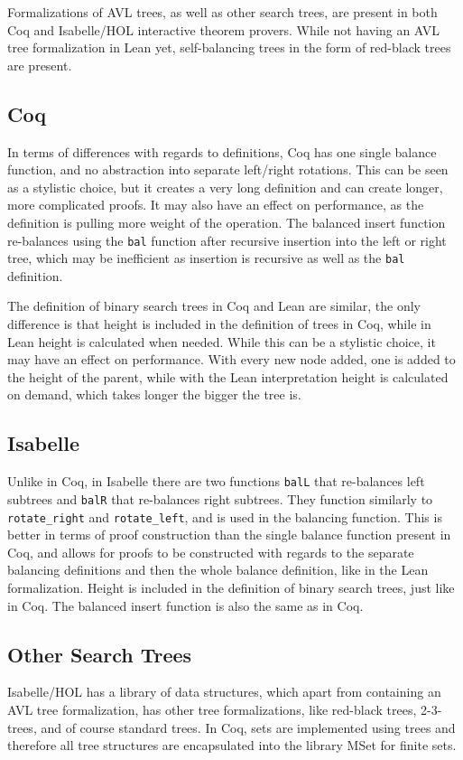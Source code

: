 Formalizations of AVL trees, as well as other search trees, are present in both Coq \cite{code:coq} and Isabelle/HOL \cite{isabelle} interactive theorem provers. While not having an AVL tree formalization in Lean yet, self-balancing trees in the form of red-black trees are present.

\subsection*{Coq}
In terms of differences with regards to definitions, Coq has one single balance function, and no abstraction into separate left/right rotations. This can be seen as a stylistic choice, but it creates a very long definition and can create longer, more complicated proofs. It may also have an effect on performance, as the definition is pulling more weight of the operation. The balanced insert function re-balances using the \lstinline{bal} function after recursive insertion into the left or right tree, which may be inefficient as insertion is recursive as well as the \lstinline{bal} definition.

The definition of binary search trees in Coq and Lean are similar, the only difference is that height is included in the definition of trees in Coq, while in Lean height is calculated when needed. While this can be a stylistic choice, it may have an effect on performance. With every new node added, one is added to the height of the parent, while with the Lean interpretation height is calculated on demand, which takes longer the bigger the tree is.

\subsection*{Isabelle}
Unlike in Coq, in Isabelle there are two functions \lstinline{balL} that re-balances left subtrees and \lstinline{balR} that re-balances right subtrees. They function similarly to \lstinline{rotate_right} and \lstinline{rotate_left}, and is used in the balancing function. This is better in terms of proof construction than the single balance function present in Coq, and allows for proofs to be constructed with regards to the separate balancing definitions and then the whole balance definition, like in the Lean formalization. Height is included in the definition of binary search trees, just like in Coq. The balanced insert function is also the same as in Coq.

\subsection*{Other Search Trees}
Isabelle/HOL has a library of data structures, which apart from containing an AVL tree formalization, has other tree formalizations, like red-black trees, 2-3-trees, and of course standard trees. In Coq, sets are implemented using trees and therefore all tree structures are encapsulated into the library MSet for finite sets.

